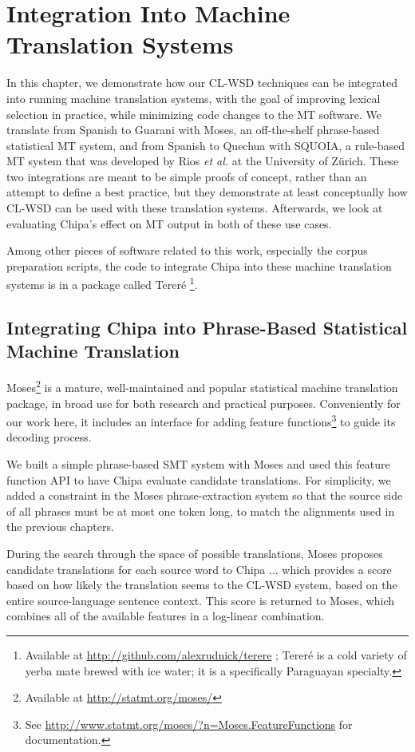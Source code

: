\chapter{Integration Into Machine Translation Systems}
\label{chap:integration}
In this chapter, we demonstrate how our CL-WSD techniques can be integrated
into running machine translation systems, with the goal of improving lexical
selection in practice, while minimizing code changes to the MT software. We
translate from Spanish to Guarani with Moses\cite{koehn-EtAl:2007:PosterDemo},
an off-the-shelf phrase-based statistical MT system, and from Spanish to
Quechua with SQUOIA, a rule-based MT system that was developed by Rios \emph{et
al.} at the University of Zürich. These two integrations are meant to be simple
proofs of concept, rather than an attempt to define a best practice, but they
demonstrate at least conceptually how CL-WSD can be used with these translation
systems.  Afterwards, we look at evaluating Chipa's effect on MT output in both
of these use cases.

Among other pieces of software related to this work, especially the corpus
preparation scripts, the code to integrate Chipa into these machine
translation systems is in a package called Tereré \footnote{Available at
\url{http://github.com/alexrudnick/terere} ; Tereré is a cold variety of yerba
mate brewed with ice water; it is a specifically Paraguayan specialty.}.

\section{Integrating Chipa into Phrase-Based Statistical Machine Translation}
Moses\footnote{Available at
\url{http://statmt.org/moses/}} is a mature,
well-maintained and popular statistical machine translation package, in broad
use for both research and practical purposes. Conveniently for our work here,
it includes an interface for adding feature functions\footnote{See
\url{http://www.statmt.org/moses/?n=Moses.FeatureFunctions} for documentation.}
to guide its decoding process.

We built a simple phrase-based SMT system with Moses and used this feature
function API to have Chipa evaluate candidate translations.
For simplicity, we added a constraint in the Moses phrase-extraction system
so that the source side of all phrases must be at most one token long, to match
the alignments used in the previous chapters.

During the search through the space of possible translations, Moses proposes
candidate translations for each source word to Chipa ...
which provides a score based on how likely the translation seems to the CL-WSD
system, based on the entire source-language sentence context. This score is
returned to Moses, which combines all of the available features in a log-linear
combination.

